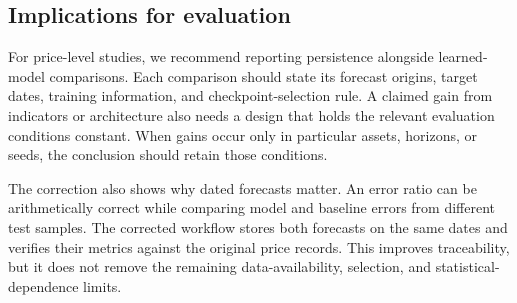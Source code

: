 \subsection{Implications for evaluation}

For price-level studies, we recommend reporting persistence alongside learned-model comparisons. Each comparison should state its forecast origins, target dates, training information, and checkpoint-selection rule. A claimed gain from indicators or architecture also needs a design that holds the relevant evaluation conditions constant. When gains occur only in particular assets, horizons, or seeds, the conclusion should retain those conditions.

The correction also shows why dated forecasts matter. An error ratio can be arithmetically correct while comparing model and baseline errors from different test samples. The corrected workflow stores both forecasts on the same dates and verifies their metrics against the original price records. This improves traceability, but it does not remove the remaining data-availability, selection, and statistical-dependence limits.
